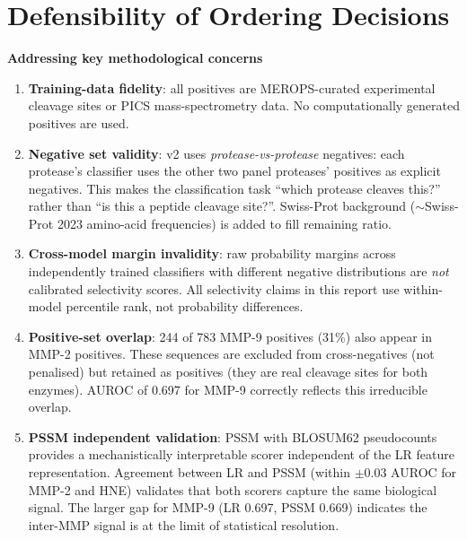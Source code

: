 \documentclass[10pt,a4paper]{article}
\begin{document}
\section{Defensibility of Ordering Decisions}

\begin{tcolorbox}[colback=boxgold,colframe=orange!50,boxrule=0.5pt]
\textbf{Addressing key methodological concerns}
\end{tcolorbox}

\begin{enumerate}[leftmargin=*,label=\textbf{D\arabic*.},topsep=3pt,itemsep=3pt]

  \item \textbf{Training-data fidelity}: all positives are MEROPS-curated
    experimental cleavage sites or PICS mass-spectrometry data.  No
    computationally generated positives are used.

  \item \textbf{Negative set validity}: v2 uses \emph{protease-vs-protease}
    negatives: each protease's classifier uses the other two panel proteases'
    positives as explicit negatives.  This makes the classification task
    ``which protease cleaves this?''  rather than ``is this a peptide cleavage
    site?''.  Swiss-Prot background ($\sim$Swiss-Prot 2023 amino-acid
    frequencies) is added to fill remaining ratio.

  \item \textbf{Cross-model margin invalidity}: raw probability margins across
    independently trained classifiers with different negative distributions
    are \emph{not} calibrated selectivity scores.  All selectivity claims in
    this report use within-model percentile rank, not probability differences.

  \item \textbf{Positive-set overlap}: 244 of 783 MMP-9 positives (31\%)
    also appear in MMP-2 positives.  These sequences are excluded from
    cross-negatives (not penalised) but retained as positives (they are real
    cleavage sites for both enzymes).  AUROC of 0.697 for MMP-9 correctly
    reflects this irreducible overlap.

  \item \textbf{PSSM independent validation}: PSSM with BLOSUM62 pseudocounts
    provides a mechanistically interpretable scorer independent of the LR
    feature representation.  Agreement between LR and PSSM (within $\pm 0.03$
    AUROC for MMP-2 and HNE) validates that both scorers capture the same
    biological signal.  The larger gap for MMP-9 (LR 0.697, PSSM 0.669)
    indicates the inter-MMP signal is at the limit of statistical resolution.


\end{enumerate}
\end{document}
